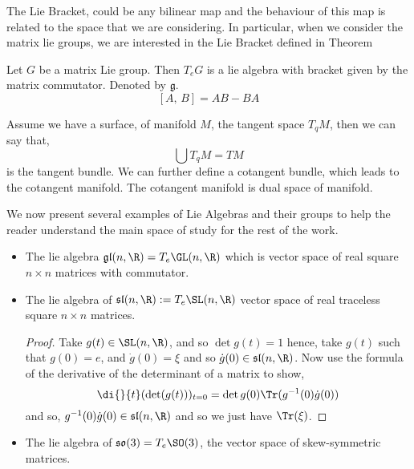 \noindent
The Lie Bracket, could be any bilinear map and the behaviour of this map is related to the space that we are considering. In particular, when we consider the matrix lie groups, we are interested in the Lie Bracket defined in Theorem 

\begin{nthm}\label{ref:LBthm}
  Let $G$ be a matrix Lie group. Then $T_eG$ is a lie algebra with bracket given by the matrix commutator. Denoted by $\mathfrak{g}$.
  $$ [A,\, B] = AB - BA $$
\end{nthm}

\noindent
Assume we have a surface, of manifold $M$, the tangent space $T_qM$, then we can say that,
$$ \bigcup T_qM = TM $$
is the tangent bundle. We can further define a cotangent bundle, which leads to the cotangent manifold. The cotangent manifold is dual space of manifold.\newpage

\noindent
We now present several examples of Lie Algebras and their groups to help the reader understand the main space of study for the rest of the work.

\begin{eg}
  \begin{itemize}
    \item The lie algebra $\mathfrak{gl}(n, \R) = T_e\GL(n, \R)$ which is vector space of real square $n \times n$ matrices with commutator.
    \item The lie algebra of $\mathfrak{sl}(n, \R) := T_e \SL(n, \R)$ vector space of real traceless square $n \times n$ matrices.
    \begin{proof}
      Take $g(t) \in \SL(n, \R)$, and so $\det g(t) = 1$ hence, take $g(t)$ such that $g(0) = e$, and $\dot g(0) = \xi$ and so $\dot g(0) \in \mathfrak{sl}(n, \R)$. Now use the formula of the derivative of the determinant of a matrix to show,
      $$ \di {}{t} (\det (g(t)))_{t=0} = \det {g(0)}\Tr(g^{-1}(0)\dot g(0)) $$
      and so, $g^{-1}(0)\dot g(0) \in \mathfrak{sl}(n, \R)$ and so we just have $\Tr (\xi)$.
    \end{proof}
    \item The lie algebra of $\mathfrak{so}(3) = T_e\SO(3)$, the vector space of skew-symmetric matrices.
  \end{itemize}
\end{eg}


